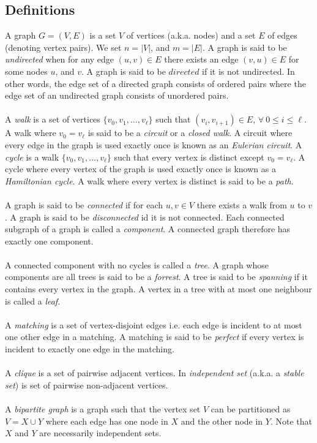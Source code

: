 \documentclass{article}
\newcommand{\ti}[1]{\textit{#1}}
\begin{document}
\subsection{Definitions}
A graph $G = (V, E)$ is a set $V$ of vertices (a.k.a. nodes) and a set $E$ of edges (denoting vertex pairs). We set $n = |V|$, and $m = |E|$. A graph is said to be \ti{undirected} when for any edge $(u, v) \in E$ there exists an edge $(v, u) \in E$ for some nodes $u$, and $v$. A graph is said to be $\ti{directed}$ if it is not undirected. In other words, the edge set of a directed graph consists of ordered pairs where the edge set of an undirected graph consists of unordered pairs.\\\\
A \ti{walk} is a set of vertices $\{v_0, v_1, \dots, v_{\ell}\}$ such that $(v_i, v_{i+1}) \in E$, $\forall\ 0 \leq i \leq \ell$. 
A walk where $v_0 = v_{\ell}$ is said to be a \ti{circuit} or a \ti{closed walk}.
A circuit where every edge in the graph is used exactly once is known as an \ti{Eulerian circuit}. 
A \ti{cycle} is a walk $\{v_0, v_1, \dots, v_{\ell}\}$ such that every vertex is distinct except $v_0 = v_{\ell}$.
A cycle where every vertex of the graph is used exactly once is known as a \ti{Hamiltonian cycle}.
A walk where every vertex is distinct is said to be a \ti{path}.\\\\
A graph is said to be \ti{connected} if for each $u, v \in V$ there exists a walk from $u$ to $v$.
A graph is said to be \ti{disconnected} id it is not connected.
Each connected subgraph of a graph is called a \ti{component}. A connected graph therefore has exactly one component.\\\\
A connected component with no cycles is called a \ti{tree}. A graph whose components are all trees is said to be a \ti{forrest}. A tree is said to be \ti{spanning} if it contains every vertex in the graph. A vertex in a tree with at most one neighbour is called a \ti{leaf}.\\\\
A \ti{matching} is a set of vertex-disjoint edges i.e. each edge is incident to at most one other edge in a matching. A matching is said to be \ti{perfect} if every vertex is incident to exactly one edge in the matching.\\\\
A \ti{clique} is a set of pairwise adjacent vertices. In \ti{independent set} (a.k.a. a \ti{stable set}) is set of pairwise non-adjacent vertices.\\\\
A \ti{bipartite graph} is a graph such that the vertex set $V$ can be partitioned as $V = X \cup Y$ where each edge has one node in $X$ and the other node in $Y$. Note that $X$ and $Y$ are necessarily independent sets.
\end{document}
